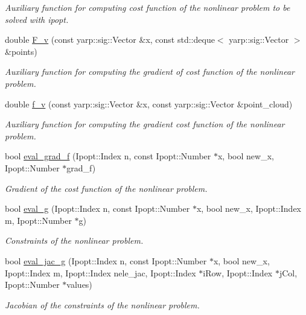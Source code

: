 \begin{DoxyCompactItemize}
\begin{DoxyCompactList}\small\item\em Auxiliary function for computing cost function of the nonlinear problem to be solved with ipopt. \end{DoxyCompactList}\item 
double \hyperlink{classSuperQuadric__NLP_adc57687952c43086dff7b2da7c3456a8}{F\-\_\-v} (const yarp\-::sig\-::\-Vector \&x, const std\-::deque$<$ yarp\-::sig\-::\-Vector $>$ \&points)
\begin{DoxyCompactList}\small\item\em Auxiliary function for computing the gradient of cost function of the nonlinear problem. \end{DoxyCompactList}\item 
double \hyperlink{classSuperQuadric__NLP_a81a0405a68364995c9209bf30901f26f}{f\-\_\-v} (const yarp\-::sig\-::\-Vector \&x, const yarp\-::sig\-::\-Vector \&point\-\_\-cloud)
\begin{DoxyCompactList}\small\item\em Auxiliary function for computing the gradient cost function of the nonlinear problem. \end{DoxyCompactList}\item 
bool \hyperlink{classSuperQuadric__NLP_a7ad18ed5adb66e686409183651de562c}{eval\-\_\-grad\-\_\-f} (Ipopt\-::\-Index n, const Ipopt\-::\-Number $\ast$x, bool new\-\_\-x, Ipopt\-::\-Number $\ast$grad\-\_\-f)
\begin{DoxyCompactList}\small\item\em Gradient of the cost function of the nonlinear problem. \end{DoxyCompactList}\item 
bool \hyperlink{classSuperQuadric__NLP_a43a2c0f905b6e38045bcb55a93ae8654}{eval\-\_\-g} (Ipopt\-::\-Index n, const Ipopt\-::\-Number $\ast$x, bool new\-\_\-x, Ipopt\-::\-Index m, Ipopt\-::\-Number $\ast$g)
\begin{DoxyCompactList}\small\item\em Constraints of the nonlinear problem. \end{DoxyCompactList}\item 
bool \hyperlink{classSuperQuadric__NLP_a2eac4aa901938d0637769c66d68aeec2}{eval\-\_\-jac\-\_\-g} (Ipopt\-::\-Index n, const Ipopt\-::\-Number $\ast$x, bool new\-\_\-x, Ipopt\-::\-Index m, Ipopt\-::\-Index nele\-\_\-jac, Ipopt\-::\-Index $\ast$i\-Row, Ipopt\-::\-Index $\ast$j\-Col, Ipopt\-::\-Number $\ast$values)
\begin{DoxyCompactList}\small\item\em Jacobian of the constraints of the nonlinear problem. \end{DoxyCompactList}\item 

\end{DoxyCompactItemize}
